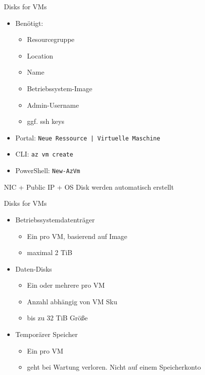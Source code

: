 
\begin{flashcard}[Definition]{Disks for VMs}
    \begin{itemize}
        \item Benötigt:
            \begin{itemize}
                \item Resourcegruppe
                \item Location
                \item Name
                \item Betriebssystem-Image
                \item Admin-Username
                \item ggf. ssh keys
            \end{itemize}
        \item Portal: \texttt{Neue Ressource | Virtuelle Maschine}
        \item CLI: \texttt{az vm create}
        \item PowerShell: \texttt{New-AzVm}
    \end{itemize}
    NIC + Public IP + OS Disk werden automatisch erstellt
\end{flashcard}

\begin{flashcard}[Definition]{Disks for VMs}
    \begin{itemize}
        \item Betriebssystemdatenträger
            \begin{itemize}
                \item Ein pro VM, basierend auf Image
                \item maximal 2 TiB
            \end{itemize}

        \item Daten-Disks
            \begin{itemize}
                \item Ein oder mehrere pro VM
                \item Anzahl abhängig von VM Sku
                \item bis zu 32 TiB Größe
            \end{itemize}

        \item Temporärer Speicher\newline
            \begin{itemize}
                \item Ein pro VM
                \item geht bei Wartung verloren. Nicht auf einem Speicherkonto
            \end{itemize}
    \end{itemize}
\end{flashcard}

